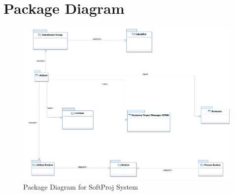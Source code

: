 \newpage

\section{Package Diagram}

\begin{figure}[h]
\includegraphics[width=15cm]{PackageDiagram.jpeg}
\centering
\caption{Package Diagram for SoftProj System}
\centering
\end{figure}



